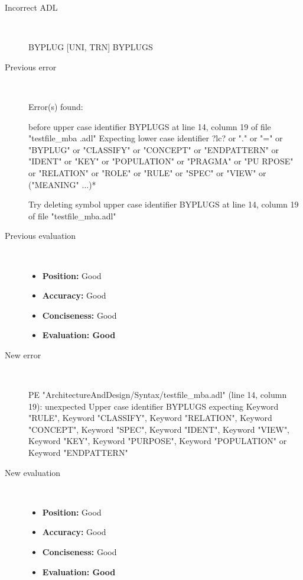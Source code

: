 \begin{description}
  \item[Incorrect ADL]~\\
\begin{adl}
BYPLUG [UNI, TRN] BYPLUGS\end{adl}
  \item[Previous error]~\\
\begin{haskell}
Error(s) found:

before upper case identifier BYPLUGS at line 14, column 19 of file "testfile_mba
.adl"
Expecting lower case identifier ?lc? or "." or "=" or "BYPLUG" or "CLASSIFY" or
"CONCEPT" or "ENDPATTERN" or "IDENT" or "KEY" or "POPULATION" or "PRAGMA" or "PU
RPOSE" or "RELATION" or "ROLE" or "RULE" or "SPEC" or "VIEW" or ("MEANING" ...)*

Try deleting symbol upper case identifier BYPLUGS at line 14, column 19 of file
"testfile_mba.adl"\end{haskell}
  \item[Previous evaluation]~\\
    \begin{itemize}
    \item \textbf{Position:} Good
    \item \textbf{Accuracy:} Good
    \item \textbf{Conciseness:} Good
    \item \textbf{Evaluation: Good}
    \end{itemize}
  \item[New error]~\\
\begin{haskell}
PE "ArchitectureAndDesign/Syntax/testfile_mba.adl" (line 14, column 19):
unexpected Upper case identifier BYPLUGS
expecting Keyword "RULE", Keyword "CLASSIFY", Keyword "RELATION", Keyword "CONCEPT", Keyword "SPEC", Keyword "IDENT", Keyword "VIEW", Keyword "KEY", Keyword "PURPOSE", Keyword "POPULATION" or Keyword "ENDPATTERN"\end{haskell}
  \item[New evaluation]~\\
    \begin{itemize}
    \item \textbf{Position:} Good
    \item \textbf{Accuracy:} Good
    \item \textbf{Conciseness:} Good
    \item \textbf{Evaluation: Good}
    \end{itemize}
  \end{description}

